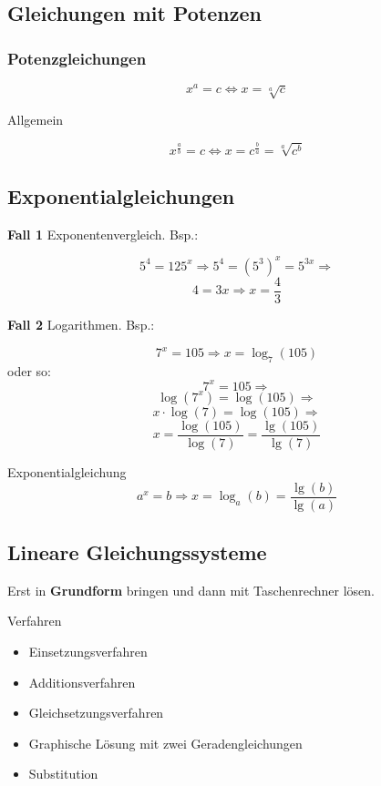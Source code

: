 \newpage
\begin{multicols}{2}


\subsection*{Gleichungen mit Potenzen}
\subsubsection*{Potenzgleichungen}

$$x^a=c \Leftrightarrow x=\sqrt[a]{c}$$

Allgemein

$$x^{\frac{a}b} = c \Leftrightarrow{}
x=c^{\frac{b}a} = \sqrt[a]{c^b}$$

\subsection*{Exponentialgleichungen}
\textbf{Fall 1} Exponentenvergleich. Bsp.:

$$5^4=125^x \Rightarrow{} 5^4=(5^3)^x=5^{3x} \Rightarrow{}$$
$$ 4=3x \Rightarrow x=\frac43$$

\textbf{Fall 2} Logarithmen. Bsp.:

$$7^x=105 \Rightarrow x=\log_7(105)$$
oder so:
$$7^x=105 \Rightarrow$$
$$ \log(7^x)=\log(105) \Rightarrow$$
$$x\cdot{}\log(7)=\log(105) \Rightarrow$$
$$ x=\frac{\log(105)}{\log(7)} = \frac{\lg(105)}{\lg(7)}$$

\begin{gesetz*}{Exponentialgleichung}{}
$$a^x=b \Rightarrow{} x=\log_a(b) = \frac{\lg(b)}{\lg(a)}$$
\end{gesetz*}


\subsection*{Lineare Gleichungssysteme}
Erst in \textbf{Grundform} bringen und dann
mit Taschenrechner  lösen.

Verfahren
\begin{itemize}
\item Einsetzungsverfahren
\item Additionsverfahren
\item Gleichsetzungsverfahren
\item Graphische Lösung mit zwei Geradengleichungen
\item Substitution
\end{itemize}


\end{multicols}
